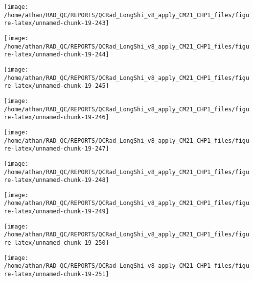 \documentclass[
  10pt,
  a4paper,oneside]{article}
\begin{document}
\begin{center}\texttt{[image: /home/athan/RAD\_QC/REPORTS/QCRad\_LongShi\_v8\_apply\_CM21\_CHP1\_files/figure-latex/unnamed-chunk-19-243]} \end{center}

\begin{center}\texttt{[image: /home/athan/RAD\_QC/REPORTS/QCRad\_LongShi\_v8\_apply\_CM21\_CHP1\_files/figure-latex/unnamed-chunk-19-244]} \end{center}

\begin{center}\texttt{[image: /home/athan/RAD\_QC/REPORTS/QCRad\_LongShi\_v8\_apply\_CM21\_CHP1\_files/figure-latex/unnamed-chunk-19-245]} \end{center}

\begin{center}\texttt{[image: /home/athan/RAD\_QC/REPORTS/QCRad\_LongShi\_v8\_apply\_CM21\_CHP1\_files/figure-latex/unnamed-chunk-19-246]} \end{center}

\begin{center}\texttt{[image: /home/athan/RAD\_QC/REPORTS/QCRad\_LongShi\_v8\_apply\_CM21\_CHP1\_files/figure-latex/unnamed-chunk-19-247]} \end{center}

\begin{center}\texttt{[image: /home/athan/RAD\_QC/REPORTS/QCRad\_LongShi\_v8\_apply\_CM21\_CHP1\_files/figure-latex/unnamed-chunk-19-248]} \end{center}

\begin{center}\texttt{[image: /home/athan/RAD\_QC/REPORTS/QCRad\_LongShi\_v8\_apply\_CM21\_CHP1\_files/figure-latex/unnamed-chunk-19-249]} \end{center}

\begin{center}\texttt{[image: /home/athan/RAD\_QC/REPORTS/QCRad\_LongShi\_v8\_apply\_CM21\_CHP1\_files/figure-latex/unnamed-chunk-19-250]} \end{center}

\begin{center}\texttt{[image: /home/athan/RAD\_QC/REPORTS/QCRad\_LongShi\_v8\_apply\_CM21\_CHP1\_files/figure-latex/unnamed-chunk-19-251]} \end{center}
\end{document}
